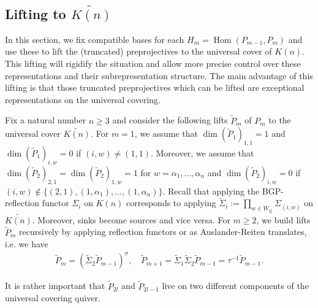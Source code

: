 \documentclass{amsart}
\newcommand{\Hom}{\operatorname{Hom}}
\begin{document}
\subsection{Lifting to $\widetilde{K(n)}$}

In this section, we fix compatible bases for each $H_m=\Hom(P_{m-1},P_m)$ and use these to lift the (truncated) preprojectives to the universal cover of $K(n)$.
This lifting will rigidify the situation and allow more precise control over these representations and their subrepresentation structure.
The main advantage of this lifting is that those truncated preprojectives which can be lifted are exceptional representations on the universal covering.

Fix a natural number $n\geq 3$ and consider the following lifts $\tilde P_m$  of $P_m$ to the universal cover $\widetilde{K(n)}$.
For $m=1$, we assume that $\dim(\tilde P_1)_{1,1}=1$ and $\dim (\tilde P_1)_{i,w}=0$ if $(i,w)\neq (1,1)$.
Moreover, we assume that $\dim (\tilde P_2)_{2,1}=\dim (\tilde P_2)_{1,w}=1$ for $w=\alpha_1,\ldots,\alpha_n$ and $\dim (\tilde P_2)_{i,w}=0$ if $(i,w)\notin\{(2,1),(1,\alpha_1),\ldots,(1,\alpha_n)\}$.
Recall that applying the BGP-reflection functor $\Sigma_i$ on $K(n)$ corresponds to applying $\tilde\Sigma_i:=\prod_{w\in W_Q}\Sigma_{(i,w)}$ on $\widetilde{K(n)}$.
Moreover, sinks become sources and vice versa.
For $m\geq 2$, we build lifts $\tilde P_m$ recursively by applying reflection functors or as Auslander-Reiten translates, i.e. we have
\begin{align}
  \label{recursive}
  \tilde P_m=(\tilde\Sigma_2 \tilde P_{m-1})^{\sigma},\quad\tilde P_{m+1}=\tilde\Sigma_{1}\tilde\Sigma_2\tilde P_{m-1}=\tau^{-1} \tilde P_{m-1}.
\end{align}

It is rather important that $\tilde P_{2l}$ and $\tilde P_{2l-1}$ live on two different components of the universal covering quiver.
\end{document}
